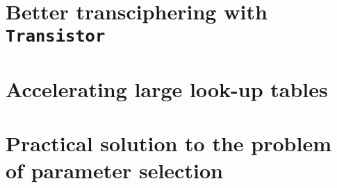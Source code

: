 \documentclass[11pt, twoside, openright]{thesis}
\begin{document}
\chapter[Better transciphering with Transistor]{Better transciphering with \texttt{Transistor}}
\label{chap:transistor}



\chapter{Accelerating large look-up tables}
\label{chap:larger_lut}


\chapter{Practical solution to the problem of parameter selection}
\label{chap:parameters}
%
%





\end{document}
